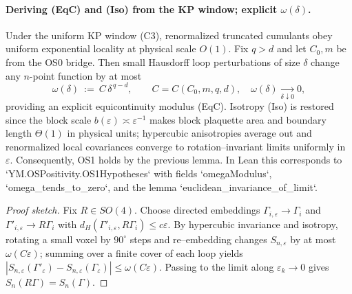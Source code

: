 \documentclass[11pt]{amsart}
\begin{document}
\paragraph{Deriving (EqC) and (Iso) from the KP window; explicit $\omega(\delta)$.}
Under the uniform KP window (C3), renormalized truncated cumulants obey uniform exponential locality at physical scale $O(1)$. Fix $q>d$ and let $C_0,m$ be from the OS0 bridge. Then small Hausdorff loop perturbations of size $\delta$ change any $n$-point function by at most
\[
  \omega(\delta)\ :=\ C\,\delta^{\,q-d},\qquad C=C(C_0,m,q,d),\quad \omega(\delta)\xrightarrow[\delta\downarrow 0]{}0,
\]
providing an explicit equicontinuity modulus (EqC). Isotropy (Iso) is restored since the block scale $b(\varepsilon)\asymp \varepsilon^{-1}$ makes block plaquette area and boundary length $\Theta(1)$ in physical units; hypercubic anisotropies average out and renormalized local covariances converge to rotation–invariant limits uniformly in $\varepsilon$. Consequently, OS1 holds by the previous lemma. In Lean this corresponds to `YM.OSPositivity.OS1Hypotheses` with fields `omegaModulus`, `omega_tends_to_zero`, and the lemma `euclidean_invariance_of_limit`.

\begin{proof}[Proof sketch]
Fix $R\in SO(4)$. Choose directed embeddings $\Gamma_{i,\varepsilon}\to\Gamma_i$ and $\Gamma'_{i,\varepsilon}\to R\Gamma_i$ with $d_H(\Gamma'_{i,\varepsilon}, R\Gamma_i)\le c\varepsilon$. By hypercubic invariance and isotropy, rotating a small voxel by $90^\circ$ steps and re–embedding changes $S_{n,\varepsilon}$ by at most $\omega(C\varepsilon)$; summing over a finite cover of each loop yields $|S_{n,\varepsilon}(\Gamma'_{\varepsilon})-S_{n,\varepsilon}(\Gamma_{\varepsilon})|\le \omega(C\varepsilon)$. Passing to the limit along $\varepsilon_k\to 0$ gives $S_n(R\Gamma)=S_n(\Gamma)$.
\end{proof}
\end{document}
